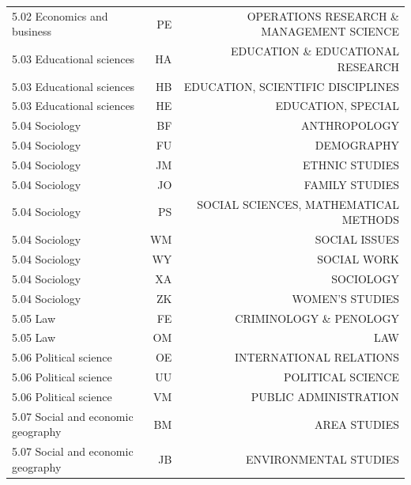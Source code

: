 \documentclass[12pt, a4paper]{article}
\begin{document}
\begin{table}[h]
\begin{adjustbox}{center}
\begin{tabular}{l|rr}
			5.02 Economics and business        & PE & OPERATIONS RESEARCH \& MANAGEMENT SCIENCE \\
			5.03 Educational sciences          & HA & EDUCATION \& EDUCATIONAL RESEARCH         \\
			5.03 Educational sciences          & HB & EDUCATION, SCIENTIFIC DISCIPLINES         \\
			5.03 Educational sciences          & HE & EDUCATION, SPECIAL                        \\
			5.04 Sociology                     & BF & ANTHROPOLOGY                              \\
			5.04 Sociology                     & FU & DEMOGRAPHY                                \\
			5.04 Sociology                     & JM & ETHNIC STUDIES                            \\
			5.04 Sociology                     & JO & FAMILY STUDIES                            \\
			5.04 Sociology                     & PS & SOCIAL SCIENCES, MATHEMATICAL METHODS     \\
			5.04 Sociology                     & WM & SOCIAL ISSUES                             \\
			5.04 Sociology                     & WY & SOCIAL WORK                               \\
			5.04 Sociology                     & XA & SOCIOLOGY                                 \\
			5.04 Sociology                     & ZK & WOMEN'S STUDIES                           \\
			5.05 Law                           & FE & CRIMINOLOGY \& PENOLOGY                   \\
			5.05 Law                           & OM & LAW                                       \\
			5.06 Political science             & OE & INTERNATIONAL RELATIONS                   \\
			5.06 Political science             & UU & POLITICAL SCIENCE                         \\
			5.06 Political science             & VM & PUBLIC ADMINISTRATION                     \\
			5.07 Social and economic geography & BM & AREA STUDIES                              \\
			5.07 Social and economic geography & JB & ENVIRONMENTAL STUDIES                     \\

\end{tabular}
\end{adjustbox}
\end{table}
\end{document}

